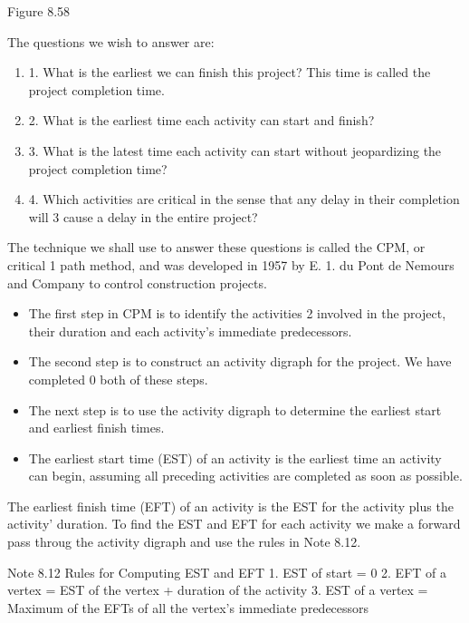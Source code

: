 \documentclass{article}
\begin{document}
Figure 8.58 

The questions we wish to answer are: 
\begin{enumerate}
\item 1. What is the earliest we can finish this project? This time is called the project completion time. 
\item 2. What is the earliest time each activity can start and finish? 
\item 3. What is the latest time each activity can start without jeopardizing the project completion time? 
\item 4. Which activities are critical in the sense that any delay in their completion will 3 cause a delay in the entire project? 
\end{enumerate}

The technique we shall use to answer these questions is called the CPM, or critical 1 path method, and was developed in 1957 by E. 1. du Pont de Nemours and Company 
to control construction projects.
\begin{itemize}
    \item The first step in CPM is to identify the activities 2 involved in the project, their duration and each activity's immediate predecessors. 
\item The second step is to construct an activity digraph for the project. We have completed 0 both of these steps. 
\item The next step is to use the activity digraph to determine the earliest start and earliest finish times. 
\item The earliest start time (EST) of an activity is the earliest time an activity can begin, assuming all preceding activities are completed as soon as possible. 
\end{itemize}




 
The earliest finish time (EFT) of an activity is the EST for the activity plus the activity' 
duration. To find the EST and EFT for each activity we make a forward pass throug 
the activity digraph and use the rules in Note 8.12. 
\begin{framed}
Note 8.12 Rules for Computing EST and EFT 
1. EST of start = 0 
2. EFT of a vertex = EST of the vertex + duration of the activity 
3. EST of a vertex = Maximum of the EFTs of all the vertex's immediate 
predecessors 
\end{framed}
\end{document}
